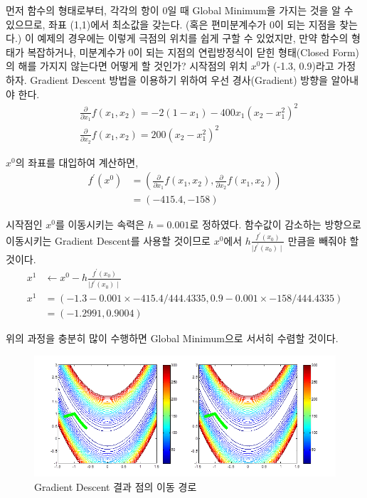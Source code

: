 \documentclass[a4paper]{oblivoir}
\begin{document}
\indent 먼저 함수의 형태로부터, 각각의 항이 0일 때 Global Minimum을 가지는 것을 알 수 있으므로, 좌표 (1,1)에서 최소값을 갖는다. (혹은 편미분계수가 0이 되는 지점을 찾는다.) 이 예제의 경우에는 이렇게 극점의 위치를 쉽게 구할 수 있었지만, 만약 함수의 형태가 복잡하거나, 미분계수가 0이 되는 지점의 연립방정식이 닫힌 형태(Closed Form)의 해를 가지지 않는다면 어떻게 할 것인가?
\indent 시작점의 위치 \textbf{$x^{0}$}가 (-1.3, 0.9)라고 가정하자. Gradient Descent 방법을 이용하기 위하여 우선 경사(Gradient) 방향을 알아내야 한다.
\begin{align*}
&\frac{\partial}{\partial x_{1}}f(x_{1},x_{2}) = -2(1-x_{1})-400x_{1}(x_{2}-x_{1}^{2})^{2} \tag{4-41}\\
&\frac{\partial}{\partial x_{2}}f(x_{1},x_{2}) = 200(x_{2}-x_{1}^{2})^{2} \tag{4-42}
\end{align*}

\indent \textbf{$x^{0}$}의 좌표를 대입하여 계산하면,
\begin{align*}
\textbf{$f^{\prime}(x^{0})$}
&= \left( \frac{\partial}{\partial x_{1}}f(x_{1},x_{2}), \frac{\partial}{\partial x_{2}}f(x_{1},x_{2}) \right) \tag{4-43} \\
&= (-415.4, -158) \tag{4-44}
\end{align*}

\indent 시작점인 \textbf{$x^{0}$}를 이동시키는 속력은 $h=0.001$로 정하였다. 함수값이 감소하는 방향으로 이동시키는 Gradient Descent를 사용할 것이므로 \textbf{$x^{0}$}에서 $h\frac{f^{\prime}(x_{0})}{\mid f^{\prime}(x_{0}) \mid}$ 만큼을 빼줘야 할 것이다.
\begin{align*}
\textbf{$x^{1}$} & \gets \textbf{$x^{0}$} - h\frac{f^{\prime}(x_{0})}{\mid f^{\prime}(x_{0}) \mid} \tag{4-45} \\
\textbf{$x^{1}$} & = (-1.3 - 0.001 \times -415.4/444.4335, 0.9 - 0.001 \times -158/444.4335 ) \tag{4-46} \\
& = (-1.2991, 0.9004) \tag{4-47}
\end{align*}

\indent 위의 과정을 충분히 많이 수행하면 Global Minimum으로 서서히 수렴할 것이다.
\begin{figure}[ht]
\centering
\includegraphics[scale=0.9]{GD_Rosenbrock.png}
\caption{Gradient Descent 결과 점의 이동 경로}
\label{Figure 4-9}
\end{figure}
\end{document}
